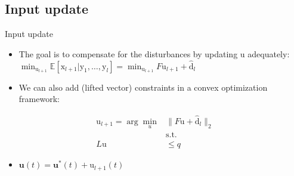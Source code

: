 \documentclass{beamer}
\newcommand{\sysInput}{\mathbf{u}} %
\newcommand{\liftedinput}{\mathrm{u}}
\newcommand{\liftedstate}{\mathrm{x}}
\newcommand{\liftedobs}{\mathrm{y}}
\newcommand{\disturbance}{\mathrm{d}}
\begin{document}
\subsection{Input update}
%
\begin{frame}{Input update}
\begin{itemize}
\item The goal is to compensate for the disturbances by updating $\liftedinput$ adequately: $\min_{\liftedinput_{l+1}} \mathbb{E}[\liftedstate_{l+1}| \liftedobs_1, \ldots, \liftedobs_l] = \min_{\liftedinput_{l+1}} F\liftedinput_{l+1} + \hat{\disturbance}_l$ \pause 
\item We can also add (lifted vector) constraints in a convex optimization framework: \pause
\end{itemize}
\begin{equation}
\begin{aligned}
\liftedinput_{l+1} = \arg\min_{u} &\|F\liftedinput + \hat{\disturbance}_l \|_{2} \\
& \text{s.t.} \\
L\liftedinput & \leq q
\end{aligned}
\end{equation}
\pause
\begin{itemize}
\item $\sysInput(t) = \sysInput^{*}(t) + \liftedinput_{l+1}(t)$
\end{itemize}
\end{frame}
%
\end{document}
